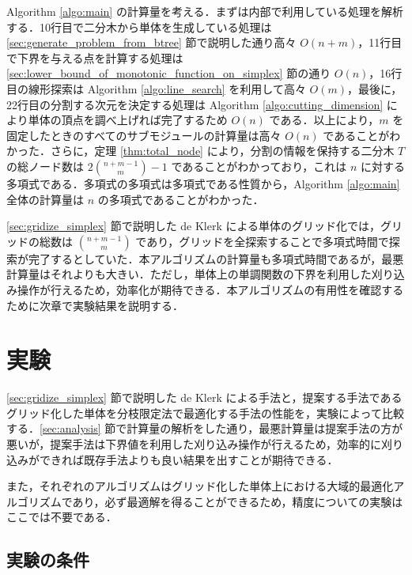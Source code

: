 \documentclass[a4paper,11pt]{jreport}
\begin{document}
Algorithm \ref{algo:main} の計算量を考える．まずは内部で利用している処理を解析する．10行目で二分木から単体を生成している処理は \ref{sec:generate_problem_from_btree} 節で説明した通り高々 $ O(n + m) $，11行目で下界を与える点を計算する処理は \ref{sec:lower_bound_of_monotonic_function_on_simplex} 節の通り $ O(n) $，16行目の線形探索は Algorithm \ref{algo:line_search} を利用して高々 $ O(m) $，最後に，22行目の分割する次元を決定する処理は Algorithm \ref{algo:cutting_dimension} により単体の頂点を調べ上げれば完了するため $ O(n) $ である．以上により，$ m $ を固定したときのすべてのサブモジュールの計算量は高々 $ O(n) $ であることがわかった．さらに，定理 \ref{thm:total_node} により，分割の情報を保持する二分木 $ T $ の総ノード数は $ 2 \binom{n + m - 1}{m} - 1 $ であることがわかっており，これは $ n $ に対する多項式である．多項式の多項式は多項式である性質から，Algorithm \ref{algo:main} 全体の計算量は $ n $ の多項式であることがわかった．\par
\ref{sec:gridize_simplex} 節で説明した de Klerk による単体のグリッド化では，グリッドの総数は $ \binom{n + m - 1}{m} $ であり，グリッドを全探索することで多項式時間で探索が完了するとしていた．本アルゴリズムの計算量も多項式時間であるが，最悪計算量はそれよりも大きい．ただし，単体上の単調関数の下界を利用した刈り込み操作が行えるため，効率化が期待できる．本アルゴリズムの有用性を確認するために次章で実験結果を説明する．

\chapter{実験}

\ref{sec:gridize_simplex} 節で説明した de Klerk による手法と，提案する手法であるグリッド化した単体を分枝限定法で最適化する手法の性能を，実験によって比較する．\ref{sec:analysis} 節で計算量の解析をした通り，最悪計算量は提案手法の方が悪いが，提案手法は下界値を利用した刈り込み操作が行えるため，効率的に刈り込みができれば既存手法よりも良い結果を出すことが期待できる．\par
また，それぞれのアルゴリズムはグリッド化した単体上における大域的最適化アルゴリズムであり，必ず最適解を得ることができるため，精度についての実験はここでは不要である．\par

\section{実験の条件}
\end{document}
